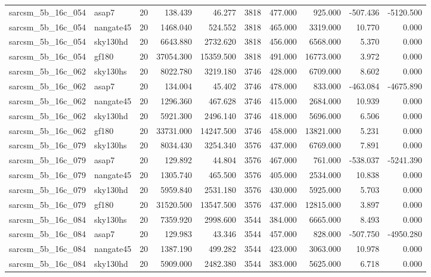 \documentclass{article}
\begin{document}
\begin{longtable}{llrrrrrrrr}
sarcsm\_5b\_16c\_054 & asap7 & 20 & 138.439 & 46.277 & 3818 & 477.000 & 925.000 & -507.436 & -5120.500 \\
sarcsm\_5b\_16c\_054 & nangate45 & 20 & 1468.040 & 524.552 & 3818 & 465.000 & 3319.000 & 10.770 & 0.000 \\
sarcsm\_5b\_16c\_054 & sky130hd & 20 & 6643.880 & 2732.620 & 3818 & 456.000 & 6568.000 & 5.370 & 0.000 \\
sarcsm\_5b\_16c\_054 & gf180 & 20 & 37054.300 & 15359.500 & 3818 & 491.000 & 16773.000 & 3.972 & 0.000 \\
sarcsm\_5b\_16c\_062 & sky130hs & 20 & 8022.780 & 3219.180 & 3746 & 428.000 & 6709.000 & 8.602 & 0.000 \\
sarcsm\_5b\_16c\_062 & asap7 & 20 & 134.004 & 45.402 & 3746 & 478.000 & 833.000 & -463.084 & -4675.890 \\
sarcsm\_5b\_16c\_062 & nangate45 & 20 & 1296.360 & 467.628 & 3746 & 415.000 & 2684.000 & 10.939 & 0.000 \\
sarcsm\_5b\_16c\_062 & sky130hd & 20 & 5921.300 & 2496.140 & 3746 & 418.000 & 5696.000 & 6.506 & 0.000 \\
sarcsm\_5b\_16c\_062 & gf180 & 20 & 33731.000 & 14247.500 & 3746 & 458.000 & 13821.000 & 5.231 & 0.000 \\
sarcsm\_5b\_16c\_079 & sky130hs & 20 & 8034.430 & 3254.340 & 3576 & 437.000 & 6769.000 & 7.891 & 0.000 \\
sarcsm\_5b\_16c\_079 & asap7 & 20 & 129.892 & 44.804 & 3576 & 467.000 & 761.000 & -538.037 & -5241.390 \\
sarcsm\_5b\_16c\_079 & nangate45 & 20 & 1305.740 & 465.500 & 3576 & 405.000 & 2534.000 & 10.838 & 0.000 \\
sarcsm\_5b\_16c\_079 & sky130hd & 20 & 5959.840 & 2531.180 & 3576 & 430.000 & 5925.000 & 5.703 & 0.000 \\
sarcsm\_5b\_16c\_079 & gf180 & 20 & 31520.500 & 13547.500 & 3576 & 437.000 & 12815.000 & 3.897 & 0.000 \\
sarcsm\_5b\_16c\_084 & sky130hs & 20 & 7359.920 & 2998.600 & 3544 & 384.000 & 6665.000 & 8.493 & 0.000 \\
sarcsm\_5b\_16c\_084 & asap7 & 20 & 129.983 & 43.346 & 3544 & 457.000 & 828.000 & -507.750 & -4950.280 \\
sarcsm\_5b\_16c\_084 & nangate45 & 20 & 1387.190 & 499.282 & 3544 & 423.000 & 3063.000 & 10.978 & 0.000 \\
sarcsm\_5b\_16c\_084 & sky130hd & 20 & 5909.000 & 2482.380 & 3544 & 383.000 & 5625.000 & 6.718 & 0.000 \\

\end{longtable}
\end{document}
